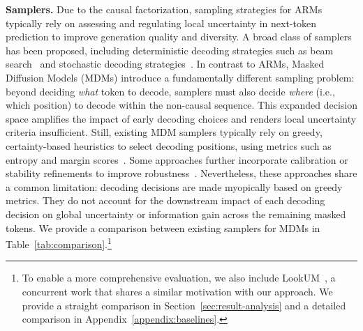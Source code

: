 \noindent\textbf{Samplers.} 
Due to the causal factorization, sampling strategies for ARMs typically rely on assessing and regulating local uncertainty in next-token prediction to improve generation quality and diversity. A broad class of samplers has been proposed, including deterministic decoding strategies such as beam search~\cite{wu2016google, freitag2017beam} and stochastic decoding strategies~\cite{holtzman2019curious,fan2018hierarchicalneuralstorygeneration,nguyen2024turning}. 
In contrast to ARMs, Masked Diffusion Models (MDMs) introduce a fundamentally different sampling problem: beyond deciding \emph{what} token to decode, samplers must also decide \emph{where} (i.e., which position) to decode within the non-causal sequence. This expanded decision space amplifies the impact of early decoding choices and renders local uncertainty criteria insufficient. Still, existing MDM samplers typically rely on greedy, certainty-based heuristics to select decoding positions, using metrics such as entropy and margin scores~\cite{nie2025large, ye2025dream, chang2022maskgit}. Some approaches further incorporate calibration or stability refinements to improve robustness~\cite{benhamu2025entropy, kim2025klass, huang2025pc}. Nevertheless, these approaches share a common limitation: decoding decisions are made myopically based on greedy metrics. They do not account for the downstream impact of each decoding decision on global uncertainty or information gain across the remaining masked tokens. We provide a comparison between existing samplers for MDMs in Table~\ref{tab:comparison}.\footnote{To enable a more comprehensive evaluation, we also include LookUM~\cite{lee2025lookahead}, a concurrent work that shares a similar motivation with our approach. We provide a straight comparison in Section~\ref{sec:result-analysis} and a detailed comparison in Appendix~\ref{appendix:baselines}.}